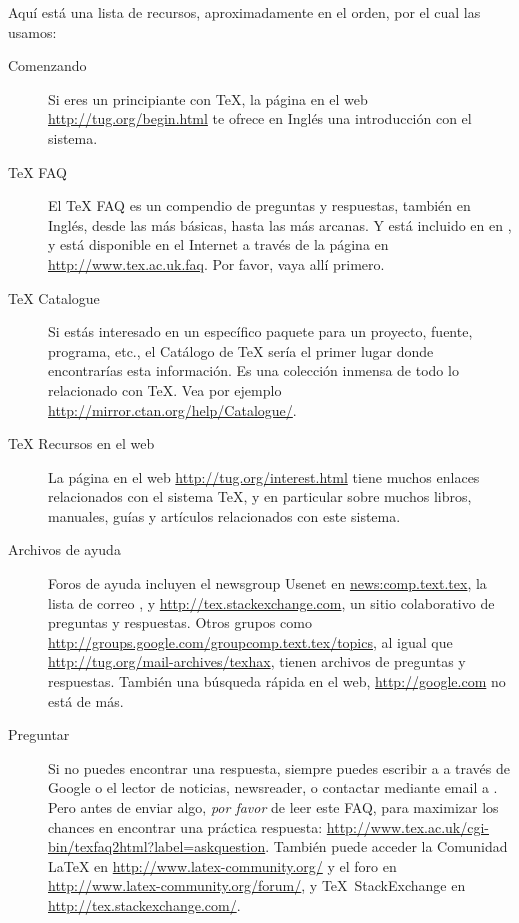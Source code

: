 \documentclass{article}
\begin{document}
Aquí está una lista de recursos, aproximadamente en el orden, por el
cual las usamos:

\begin{description}
	\item[Comenzando] Si eres un principiante con \TeX, la página en el
	web \url{http://tug.org/begin.html} te ofrece en Inglés una
	introducción con el sistema.

\item [\TeX{} FAQ] El \TeX{} FAQ es un compendio de preguntas y
respuestas, también en Inglés, desde las más básicas, hasta las más
arcanas. Y está incluido en \TL{} en
, y está disponible en el
Internet a través de la página en \url{http://www.tex.ac.uk.faq}. Por
favor, vaya allí primero.  \item [\TeX{} Catalogue] Si estás
	interesado en un específico paquete para un proyecto, fuente,
	programa, etc., el Catálogo de \TeX{} sería el primer lugar
	donde encontrarías esta información. Es una colección inmensa
	de todo lo relacionado con \TeX{}. Vea por ejemplo
	\url{http://mirror.ctan.org/help/Catalogue/}.

\item [\TeX{} Recursos en el web] La página en el web
	\url{http://tug.org/interest.html} tiene muchos enlaces
	relacionados con el sistema \TeX{}, y en particular sobre
	muchos libros, manuales, guías y artículos relacionados con
	este sistema.

\item [Archivos de ayuda] Foros de ayuda incluyen el newsgroup Usenet
	en \url{news:comp.text.tex}, la lista de correo
	, y \url{http://tex.stackexchange.com},
	un sitio colaborativo de preguntas y respuestas. Otros grupos
	como \url{http://groups.google.com/groupcomp.text.tex/topics},
	al igual que \url{http://tug.org/mail-archives/texhax}, tienen
	archivos de preguntas y respuestas. También una búsqueda
	rápida en el web, \url{http://google.com} no está de
	más.

\item [Preguntar] Si no puedes encontrar una respuesta, siempre puedes
	escribir a  a través de Google o el
	lector de noticias, newsreader, o contactar mediante email a
	. Pero antes de enviar algo, \emph{por
	favor} de leer este FAQ, para maximizar los chances en
	encontrar una práctica respuesta:
	\url{http://www.tex.ac.uk/cgi-bin/texfaq2html?label=askquestion}.
	También puede acceder la Comunidad \LaTeX{} en
	\url{http://www.latex-community.org/} y el foro en
	\url{http://www.latex-community.org/forum/}, y \TeX\
	StackExchange en \url{http://tex.stackexchange.com/}.


\end{description}
\end{document}
